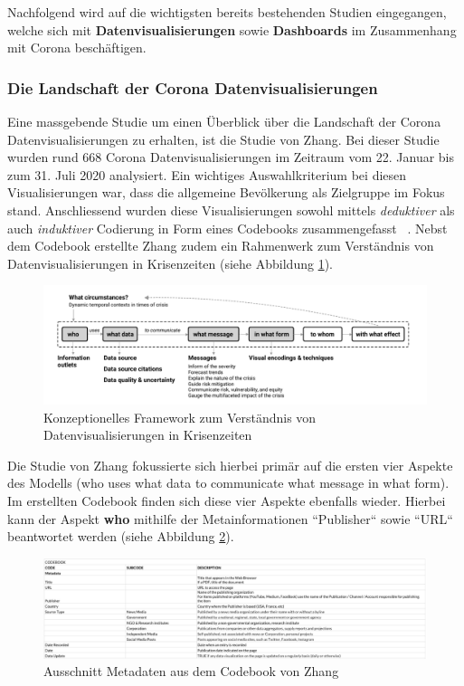 Nachfolgend wird auf die wichtigsten bereits bestehenden Studien eingegangen, welche sich mit  \textbf{Datenvisualisierungen} sowie \textbf{Dashboards} im Zusammenhang mit Corona beschäftigen.
 
 \subsubsection{Die Landschaft der Corona Datenvisualisierungen} \label{ch:landscape_of_covid_data_visualization}
 Eine massgebende Studie um einen Überblick über die Landschaft der Corona Datenvisualisierungen zu erhalten, ist die Studie von Zhang. Bei dieser Studie wurden rund 668 Corona Datenvisualisierungen im Zeitraum vom 22. Januar bis zum 31. Juli 2020 analysiert. Ein wichtiges Auswahlkriterium bei diesen Visualisierungen war, dass die allgemeine Bevölkerung als Zielgruppe im Fokus stand. Anschliessend wurden diese Visualisierungen sowohl mittels \textit{deduktiver} als auch \textit{induktiver} Codierung in Form eines Codebooks zusammengefasst ~\citep[S. 3]{yixuan_zhang}. Nebst dem Codebook erstellte Zhang zudem ein Rahmenwerk zum Verständnis von Datenvisualisierungen in Krisenzeiten (siehe Abbildung \ref{fig:zhang_conceptual_framework}).
 
 
 \begin{figure}[h]
    \includegraphics[width=12cm]{images/zhang_conceptual_framework.png}
    \centering
    \caption{Konzeptionelles Framework zum Verständnis von Datenvisualisierungen in Krisenzeiten ~\citep[S. 4]{yixuan_zhang}}
    \label{fig:zhang_conceptual_framework}
\end{figure}
 
 
 Die Studie von Zhang fokussierte sich hierbei primär auf die ersten vier Aspekte des Modells (who uses what data to communicate what message in what form). Im erstellten Codebook finden sich diese vier Aspekte ebenfalls wieder. Hierbei kann der Aspekt \textbf{who} mithilfe der Metainformationen ``Publisher`` sowie ``URL`` beantwortet werden (siehe Abbildung \ref{fig:zhang_codebook_metadata}).
 
 \begin{figure}[h]
    \includegraphics[width=12cm]{images/zhang_codebook_metadata.png}
    \centering
    \caption{Ausschnitt Metadaten aus dem Codebook von Zhang ~\citep{zhang_codebook}}
    \label{fig:zhang_codebook_metadata}
\end{figure}


